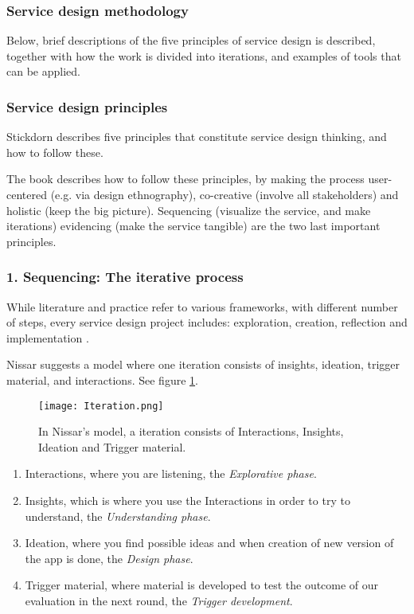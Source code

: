 \subsubsection{Service design methodology}

Below, brief descriptions of the five principles of service design is described, together with how the work is divided into iterations, and examples of tools that can be applied.

\subsubsection{Service design principles}
Stickdorn \cite{stickdorn} describes five principles that constitute service design thinking, and how to follow these.

The book describes how to follow these principles, by making the process user-centered (e.g. via design ethnography), co-creative (involve all stakeholders) and holistic (keep the big picture). Sequencing (visualize the service, and make iterations) evidencing (make the service tangible) are the two last important principles.

\subsubsection{1. Sequencing: The iterative process}
While literature and practice refer to various frameworks, with different number of steps, every service design project includes: exploration, creation, reflection and implementation \cite{stickdorn}.

Nissar \cite{expedition-mondial} suggests a model where one iteration consists of insights, ideation, trigger material, and interactions. See figure \ref{fig:iteration}.

\begin{figure}[h]
    \centering
    \texttt{[image: Iteration.png]}
    \caption{In Nissar's model, a iteration consists of Interactions, Insights, Ideation and Trigger material.}
    \label{fig:iteration}
\end{figure}

\begin{enumerate}
\item Interactions, where you are listening, the \textit{Explorative phase}.
\item Insights, which is where you use the Interactions in order to try to understand, the \textit{Understanding phase}. %
\item Ideation, where you find possible ideas and when creation of new version of the app is done, the \textit{Design phase}.
\item Trigger material, where material is developed to test the outcome of our evaluation in the next round, the \textit{Trigger development}.
\end{enumerate}

